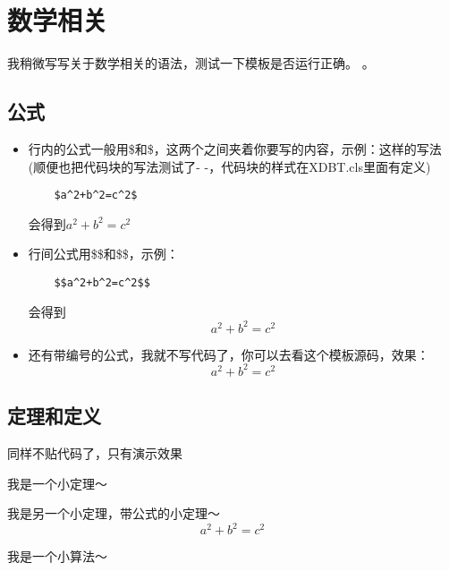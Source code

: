 
\chapter{数学相关}
\label{chap:math}
我稍微写写关于数学相关的语法，测试一下模板是否运行正确。
\cite{mycite}。

\section{公式}

\begin{itemize}
    \item 行内的公式一般用\$和\$，这两个之间夹着你要写的内容，示例：这样的写法(顺便也把代码块的写法测试了- -，代码块的样式在XDBT.cls里面有定义)%
    \begin{lstlisting}
    $a^2+b^2=c^2$
    \end{lstlisting}
    会得到$a^2+b^2=c^2$
    \item 行间公式用\$\$和\$\$，示例：
    \begin{lstlisting}
    $$a^2+b^2=c^2$$
    \end{lstlisting}
    会得到$$a^2+b^2=c^2$$
    \item 还有带编号的公式，我就不写代码了，你可以去看这个模板源码，效果：
    \begin{equation}\label{eq:lim}
        a^2+b^2=c^2
    \end{equation}
\end{itemize}

\section{定理和定义}
同样不贴代码了，只有演示效果
\begin{thm}
我是一个小定理～
\end{thm}

\begin{thm}
我是另一个小定理，带公式的小定理～
\begin{equation}
    a^2+b^2=c^2
\end{equation}
\end{thm}

\begin{algo}
我是一个小算法～
\end{algo}





